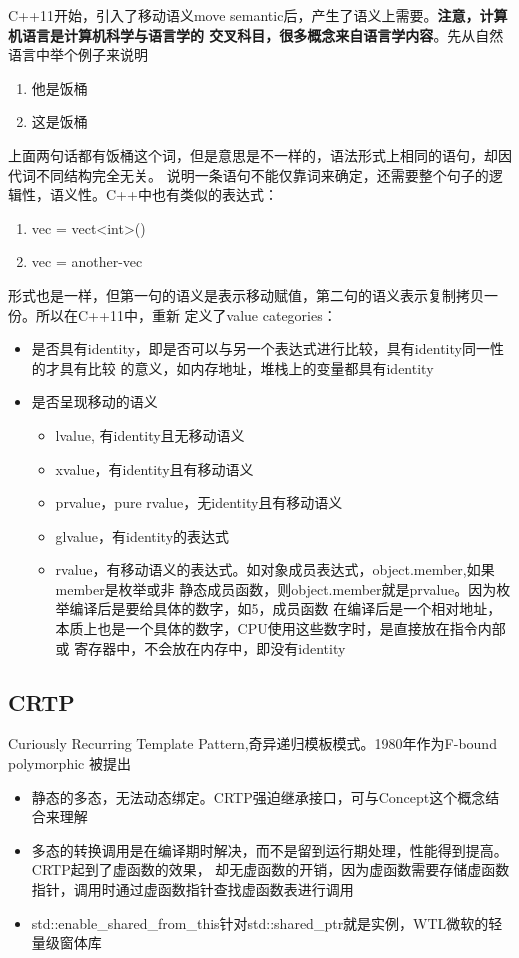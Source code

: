 C++11开始，引入了移动语义move semantic后，产生了语义上需要。\textbf{注意，计算机语言是计算机科学与语言学的
交叉科目，很多概念来自语言学内容}。先从自然语言中举个例子来说明
\begin{enumerate}
    \item {他是饭桶}
    \item {这是饭桶}
\end{enumerate}
上面两句话都有饭桶这个词，但是意思是不一样的，语法形式上相同的语句，却因代词不同结构完全无关。
说明一条语句不能仅靠词来确定，还需要整个句子的逻辑性，语义性。C++中也有类似的表达式：
\begin{enumerate}
    \item {vec = vect<int>()}
    \item {vec = another-vec}
\end{enumerate}
形式也是一样，但第一句的语义是表示移动赋值，第二句的语义表示复制拷贝一份。所以在C++11中，重新
定义了value categories：
\begin{itemize}
    \item {是否具有identity，即是否可以与另一个表达式进行比较，具有identity同一性的才具有比较
    的意义，如内存地址，堆栈上的变量都具有identity}
    \item {是否呈现移动的语义}
    \begin{itemize}
        \item {lvalue, 有identity且无移动语义}
        \item {xvalue，有identity且有移动语义}
        \item {prvalue，pure rvalue，无identity且有移动语义}
        \item {glvalue，有identity的表达式}
        \item {rvalue，有移动语义的表达式。如对象成员表达式，object.member,如果member是枚举或非
        静态成员函数，则object.member就是prvalue。因为枚举编译后是要给具体的数字，如5，成员函数
        在编译后是一个相对地址，本质上也是一个具体的数字，CPU使用这些数字时，是直接放在指令内部或
        寄存器中，不会放在内存中，即没有identity}
    \end{itemize}
\end{itemize}

\subsection{CRTP}
Curiously Recurring Template Pattern,奇异递归模板模式。1980年作为F-bound polymorphic
被提出
\begin{itemize}
    \item {静态的多态，无法动态绑定。CRTP强迫继承接口，可与Concept这个概念结合来理解}
    \item {多态的转换调用是在编译期时解决，而不是留到运行期处理，性能得到提高。CRTP起到了虚函数的效果，
    却无虚函数的开销，因为虚函数需要存储虚函数指针，调用时通过虚函数指针查找虚函数表进行调用}
    \item {std::enable\_shared\_from\_this针对std::shared\_ptr就是实例，WTL微软的轻量级窗体库}
\end{itemize}

